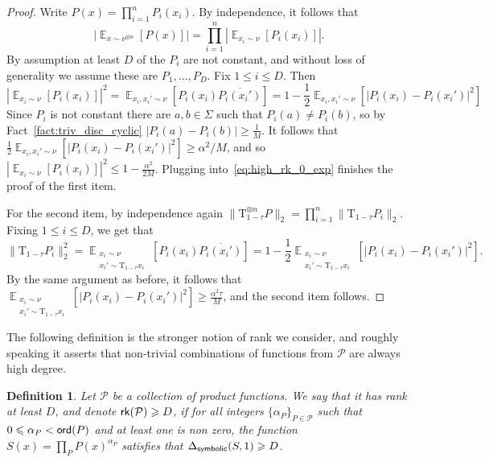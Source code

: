 \documentclass[10pt,a4paper]{amsart}
\newtheorem{definition}[thm]{Definition}
\newcommand\card[1]{\left| {#1} \right|}
\newcommand\norm[1]{\| #1 \|}
\newcommand\Expect[2]{{\mathop{\mathbb{E}}_{#1}\left[ {#2} \right]}}
\renewcommand\geq{\geqslant}
\renewcommand\leq{\leqslant}
\begin{document}
\begin{proof}
    Write $P(x) = \prod\limits_{i=1}^{n}P_i(x_i)$. 
    By independence, it follows that
    \begin{equation}\label{eq:high_rk_0_exp}
    \card{\Expect{x\sim\nu^{\otimes n}}{P(x)}}
    =\prod\limits_{i=1}^{n} \card{\Expect{x_i\sim\nu}{P_i(x_i)}}.
    \end{equation}
    By assumption at least $D$ of the $P_i$ are not constant, and without loss of generality we assume these are $P_1,\ldots,P_D$. Fix $1\leq i\leq D$. Then
    \[
    \card{\Expect{x_i\sim\nu}{P_i(x_i)}}^2
    =\Expect{x_i,x_i'\sim\nu}{P_i(x_i)\overline{P_i(x_i')}}
    =
    1-\frac{1}{2}
    \Expect{x_i,x_i'\sim\nu}{\card{P_i(x_i)-P_i(x_i')}^2}
    \]
    Since $P_i$ is not constant there are $a,b\in\Sigma$ such that $P_i(a)\neq P_i(b)$, so by Fact~\ref{fact:triv_disc_cyclic} $\card{P_i(a)-P_i(b)}\geq \frac{1}{M}$. It follows that
    $\frac{1}{2}
    \Expect{x_i,x_i'\sim\nu}{\card{P_i(x_i)-P_i(x_i')}^2}\geq \alpha^2/M$, and so $\card{\Expect{x_i\sim\nu}{P_i(x_i)}}^2\leq 1-\frac{\alpha^2}{2M}$. Plugging into~\eqref{eq:high_rk_0_exp} finishes the proof of the first item.

    For the second item, by independence again $\norm{\mathrm{T}_{1-\tau}^{\otimes n}P}_2=\prod\limits_{i=1}^{n}\norm{\mathrm{T}_{1-\tau}P_i}_2$. Fixing $1\leq i\leq D$, we get that
    \[
    \norm{\mathrm{T}_{1-\tau}P_i}_2^2
    =\Expect{\substack{x_i\sim\nu\\x_i'\sim\mathrm{T}_{1-\tau}x_i}}{P_i(x_i)\overline{P_i(x_i')}}
    =
    1-\frac{1}{2}\Expect{\substack{x_i\sim\nu\\x_i'\sim\mathrm{T}_{1-\tau}x_i}}{\card{P_i(x_i)-P_i(x_i')}^2}.
    \]
    By the same argument as before, it follows that 
    $\Expect{\substack{x_i\sim\nu\\x_i'\sim\mathrm{T}_{1-\tau}x_i}}{\card{P_i(x_i)-P_i(x_i')}^2}\geq \frac{\alpha^2\tau}{M}$, and the second item follows.
\end{proof}

The following definition is the stronger notion of rank we consider, and roughly speaking it asserts that non-trivial combinations of functions from $\mathcal{P}$ are always high degree.
\begin{definition}\label{def:rank}
    Let $\mathcal{P}$ be a collection of product functions. We say that it has rank at least $D$, and denote ${\sf rk}(\mathcal{P})\geq D$, if for all integers $\{\alpha_P\}_{P\in\mathcal{P}}$ such that $0\leq \alpha_P<{\sf ord}(P)$ and at least one is non zero, the function $S(x) = \prod\limits_{P}P(x)^{\alpha_P}$ satisfies that
    $\Delta_{{\sf symbolic}}(S,1)\geq D$. 
\end{definition}
\end{document}

